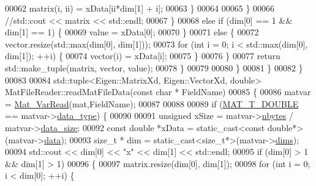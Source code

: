 \begin{DoxyCode}
{{{{00062                                 matrix(i, ii) = xData[ii*dim[1] + i];
00063                             \}
00064 
00065                         \}
00066                         \textcolor{comment}{//std::cout << matrix << std::endl;}
00067                     \}
00068                     \textcolor{keywordflow}{else} \textcolor{keywordflow}{if} (dim[0] == 1 && dim[1] == 1) \{
00069                         value = xData[0];
00070                     \}
00071                     \textcolor{keywordflow}{else} \{
00072                         vector.resize(std::max(dim[0], dim[1]));
00073                         \textcolor{keywordflow}{for} (\textcolor{keywordtype}{int} i = 0; i < std::max(dim[0], dim[1]); ++i) \{
00074                             vector(i) = xData[i];
00075                         \}
00076                     \}
00077                     \textcolor{keywordflow}{return} std::make\_tuple(matrix, vector, value);
00078                 \}
00079 
00080         \}
00081     \}
00082 \}
00083 
00084 std::tuple<Eigen::MatrixXd, Eigen::VectorXd, double> MatFileReader::readMatFileData(\textcolor{keyword}{const} \textcolor{keywordtype}{char} * FieldName)
00085 \{
00086     matvar = \hyperlink{group___m_a_t_ga3505f63029763eaa73d5a19f1115eb42}{Mat\_VarRead}(mat,FieldName);
00087 
00088     
00089     \textcolor{keywordflow}{if} (\hyperlink{group___m_a_t_ggacf7b3b879282b7ab3a51190e49bf3453a31e721ecf7e188196f83c32838288797}{MAT\_T\_DOUBLE} == matvar->\hyperlink{group___m_a_t_ab6aafe9bd77f0f077852593dec438144}{data\_type}) \{
00090 
00091         \textcolor{keywordtype}{unsigned} xSize = matvar->\hyperlink{group___m_a_t_abf1c844540503be2df9bb3db93cfe307}{nbytes} / matvar->\hyperlink{group___m_a_t_a9ad1c82e2b568da617e12dc73a26e1f9}{data\_size};
00092         \textcolor{keyword}{const} \textcolor{keywordtype}{double} *xData = \textcolor{keyword}{static\_cast<}\textcolor{keyword}{const }\textcolor{keywordtype}{double}*\textcolor{keyword}{>}(matvar->\hyperlink{group___m_a_t_a5672978efa230bbdecdf38ede781f7fa}{data});
00093         \textcolor{keywordtype}{size\_t} * dim = \textcolor{keyword}{static\_cast<}\textcolor{keywordtype}{size\_t}*\textcolor{keyword}{>}(matvar->\hyperlink{group___m_a_t_a8e01234e1c862ce3472bb37f5a09b92c}{dims});
00094         std::cout << dim[0] << \textcolor{stringliteral}{"x"} << dim[1] << std::endl;
00095         \textcolor{keywordflow}{if} (dim[0] > 1 && dim[1] > 1)
00096         \{
00097             matrix.resize(dim[0], dim[1]);
00098             \textcolor{keywordflow}{for} (\textcolor{keywordtype}{int} i = 0; i < dim[0]; ++i) \{
}}}}
\end{DoxyCode}
